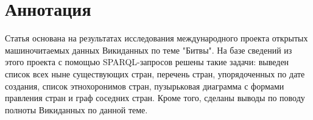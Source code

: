 \section{Аннотация}

Статья основана на результатах исследования международного проекта открытых машиночитаемых данных Викиданных по теме "Битвы". На базе сведений из этого проекта с помощью SPARQL-запросов решены такие задачи: выведен список всех ныне существующих стран, перечень стран, упорядоченных по дате создания, список этнохоронимов стран, пузырьковая диаграмма с формами правления стран и граф соседних стран. Кроме того, сделаны выводы по поводу полноты Викиданных по данной теме.